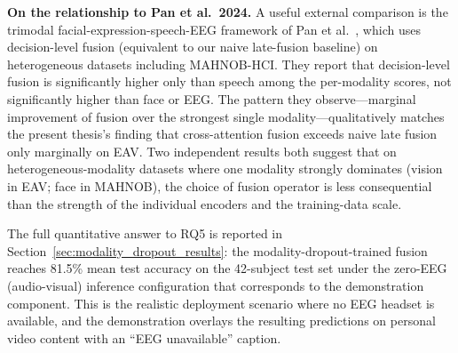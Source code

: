 \textbf{On the relationship to Pan et al.\ 2024.} A useful external comparison is the trimodal facial-expression-speech-EEG framework of Pan et al.\ \cite{Pan2024OJEMB}, which uses decision-level fusion (equivalent to our naive late-fusion baseline) on heterogeneous datasets including MAHNOB-HCI. They report that decision-level fusion is significantly higher only than speech among the per-modality scores, not significantly higher than face or EEG. The pattern they observe---marginal improvement of fusion over the strongest single modality---qualitatively matches the present thesis's finding that cross-attention fusion exceeds naive late fusion only marginally on EAV. Two independent results both suggest that on heterogeneous-modality datasets where one modality strongly dominates (vision in EAV; face in MAHNOB), the choice of fusion operator is less consequential than the strength of the individual encoders and the training-data scale.

The full quantitative answer to RQ5 is reported in Section~\ref{sec:modality_dropout_results}: the modality-dropout-trained fusion reaches 81.5\% mean test accuracy on the 42-subject test set under the zero-EEG (audio-visual) inference configuration that corresponds to the demonstration component. This is the realistic deployment scenario where no EEG headset is available, and the demonstration overlays the resulting predictions on personal video content with an ``EEG unavailable'' caption.
